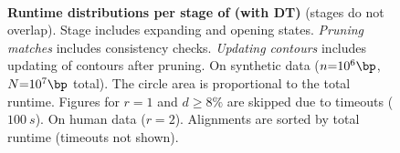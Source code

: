 \begin{figure}[H]
    \centering
    \\
     \caption[Runtime distributions per stage of \astarpa (\GCH with
    DT)]{\textbf{Runtime distributions per stage of \astarpa (\GCH with DT)}
    (stages do not overlap). Stage \emph{\A} includes expanding and opening
    states. \emph{Pruning matches} includes consistency checks. \emph{Updating
    contours} includes updating of contours after pruning.
    \protect{} On synthetic data ($n{=}10^6\bp$,
    $N{=}10^7\bp$ total). The circle area is proportional to the total runtime.
    Figures for $r{=}1$ and $d{\geq}8\%$ are skipped due to timeouts
    ($\qty{100}{s}$). \protect{} On human data ($r{=}2$).
    Alignments are sorted by total runtime (timeouts not shown).}
\end{figure}
